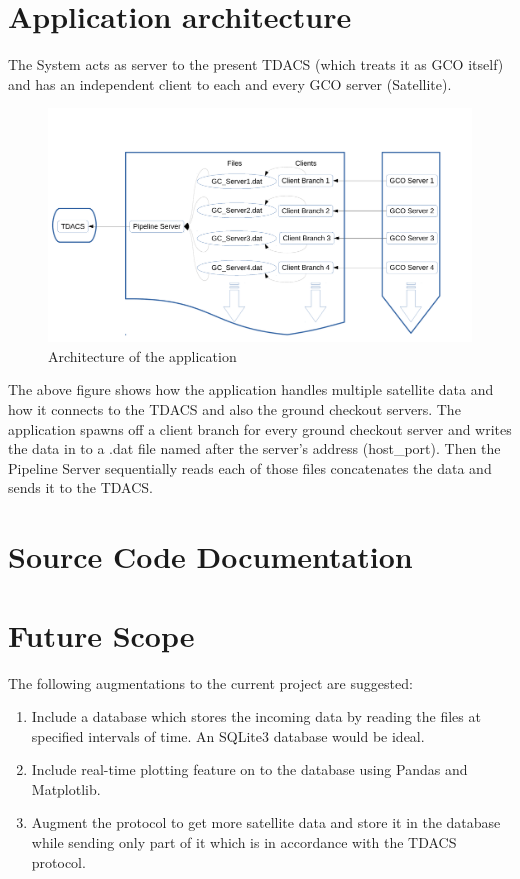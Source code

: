 \documentclass[12pt, a4paper]{report}
\begin{document}
\chapter{Application architecture}
The System acts as server to the present TDACS (which treats it as GCO itself)
and has an independent client to each and every GCO server (Satellite).

\begin{figure}[!h]
	\centering
	\includegraphics[scale=0.5]{arch.pdf}
	\caption{Architecture of the application}
\end{figure}

\par The above figure shows how the application handles multiple satellite data
and how it connects to the TDACS and also the ground checkout servers. The
application spawns off a client branch for every ground checkout server and
writes the data in to a .dat file named after the server's address (host\_port).
Then the Pipeline Server sequentially reads each of those files concatenates
the data and sends it to the TDACS.

\chapter{Source Code Documentation}



\chapter{Future Scope}
\par The following augmentations to the current project are suggested:
\begin{enumerate}
	\item Include a database which stores the incoming data by reading the
		files at specified intervals of time. An SQLite3 database would be
		ideal.
	\item Include real-time plotting feature on to the database using Pandas
		and Matplotlib.
	\item Augment the protocol to get more satellite data and store it in the
		database while sending only part of it which is in accordance with the
		TDACS protocol.
\end{enumerate}
\end{document}
